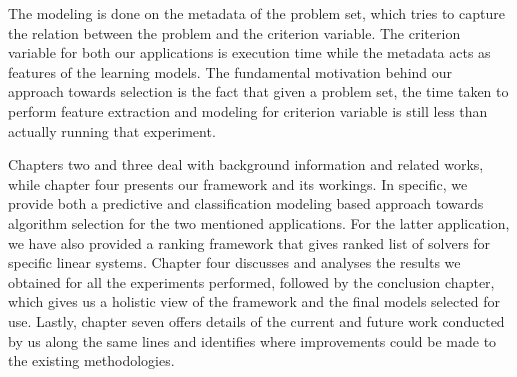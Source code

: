 The modeling is done on the metadata of the problem set, which tries to capture the relation between the problem and the criterion variable. The criterion variable for both our applications is execution time while the metadata acts as features of the learning models. The fundamental motivation behind our approach towards selection is the fact that given a problem set, the time taken to perform feature extraction and modeling for criterion variable is still less than actually running that experiment. 

Chapters two and three deal with background information and related works, while chapter four presents our framework and its workings. In specific, we provide both a predictive and classification modeling based approach towards algorithm selection for the two mentioned applications. For the latter application, we have also provided a ranking framework that gives ranked list of solvers for specific linear systems. Chapter four discusses and analyses the results we obtained for all the experiments performed, followed by the conclusion chapter, which gives us a holistic view of the framework and the final models selected for use. Lastly, chapter seven offers details of the current and future work conducted by us along the same lines and identifies where improvements could be made to the existing methodologies.

